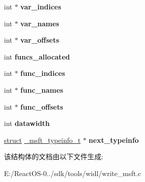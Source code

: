 \begin{DoxyCompactItemize}
\item 
\mbox{\label{struct__msft__typeinfo__t_ad5597db5ddf0a7ffd309e7a9fe68b1ad}} 
int $\ast$ {\bfseries var\+\_\+indices}
\item 
\mbox{\label{struct__msft__typeinfo__t_af176d71b081d688729806761c287b94b}} 
int $\ast$ {\bfseries var\+\_\+names}
\item 
\mbox{\label{struct__msft__typeinfo__t_a4248ce8f30588490ccf1bdf615237a38}} 
int $\ast$ {\bfseries var\+\_\+offsets}
\item 
\mbox{\label{struct__msft__typeinfo__t_afba87417e53db90d15fa3f4cbf683acf}} 
int {\bfseries funcs\+\_\+allocated}
\item 
\mbox{\label{struct__msft__typeinfo__t_ae3e262ba07a908df32f124ab6efe608f}} 
int $\ast$ {\bfseries func\+\_\+indices}
\item 
\mbox{\label{struct__msft__typeinfo__t_a4a9b47932879a9bd8d793a504ee86ef7}} 
int $\ast$ {\bfseries func\+\_\+names}
\item 
\mbox{\label{struct__msft__typeinfo__t_acbb739b5f0f6514040b5a5ec89551fd8}} 
int $\ast$ {\bfseries func\+\_\+offsets}
\item 
\mbox{\label{struct__msft__typeinfo__t_abc059d62e3e9af8bcf66373f034a8611}} 
int {\bfseries datawidth}
\item 
\mbox{\label{struct__msft__typeinfo__t_a56924cb723f7d771a5ecbca1c4874a7d}} 
\hyperlink{interfacestruct}{struct} \hyperlink{struct__msft__typeinfo__t}{\+\_\+msft\+\_\+typeinfo\+\_\+t} $\ast$ {\bfseries next\+\_\+typeinfo}
\end{DoxyCompactItemize}


该结构体的文档由以下文件生成\+:\begin{DoxyCompactItemize}
\item 
E\+:/\+React\+O\+S-\/0../sdk/tools/widl/write\+\_\+msft.\+c\end{DoxyCompactItemize}
